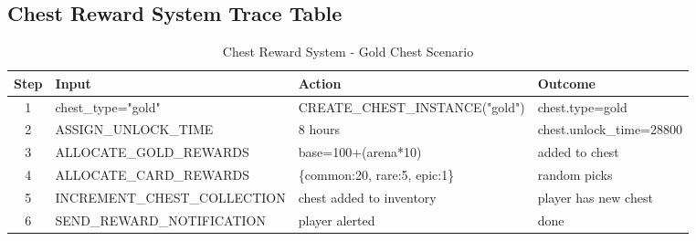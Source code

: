\documentclass{article}
\begin{document}
\subsection{Chest Reward System Trace Table}
\begin{table}[H]
\centering
\footnotesize
\begin{tabular}{|c|p{3.5cm}|p{5cm}|p{3cm}|}
\hline
\textbf{Step} & \textbf{Input} & \textbf{Action} & \textbf{Outcome}\\
\hline
1 & chest\_type="gold" & CREATE\_CHEST\_INSTANCE("gold") & chest.type=gold \\
\hline
2 & ASSIGN\_UNLOCK\_TIME & 8 hours & chest.unlock\_time=28800 \\
\hline
3 & ALLOCATE\_GOLD\_REWARDS & base=100+(arena*10) & added to chest \\
\hline
4 & ALLOCATE\_CARD\_REWARDS & \{common:20, rare:5, epic:1\} & random picks \\
\hline
5 & INCREMENT\_CHEST\_COLLECTION & chest added to inventory & player has new chest \\
\hline
6 & SEND\_REWARD\_NOTIFICATION & player alerted & done \\
\hline
\end{tabular}
\caption{Chest Reward System - Gold Chest Scenario}
\end{table}
\end{document}
